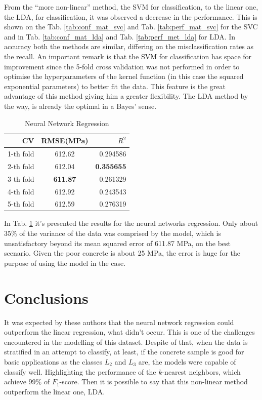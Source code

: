 \documentclass[conference]{IEEEtran}
\begin{document}
From the ``more non-linear'' method, the SVM for classification, to the linear one, the LDA, for classification, it was observed a decrease in the performance. This is shown on the Tab. \ref{tab:conf_mat_svc} and Tab. \ref{tab:perf_mat_svc} for the SVC and in Tab. \ref{tab:conf_mat_lda} and Tab. \ref{tab:perf_met_lda} for LDA. In accuracy both the methods are similar, differing on the misclassification rates as the recall. An important remark is that the SVM for classification has space for improvement since the 5-fold cross validation was not performed in order to optimise the hyperparameters of the kernel function (in this case the squared exponential parameters) to better fit the data. This feature is the great advantage of this method giving him a greater flexibility. The LDA method by the way, is already the optimal in a Bayes' sense.

\begin{table}
\centering
  \caption{Neural Network Regression}
  \label{tab:nnr}
  \begin{tabular}{rcr}
    \hline\hline
    \textbf{CV} & \textbf{RMSE}(MPa) & \textbf{$R^2$} \\\hline
    1-th fold & 612.62 & 0.294586 \\
    2-th fold & 612.04 & \textbf{0.355655} \\
    3-th fold & \textbf{611.87} & 0.261329 \\
    4-th fold & 612.92 & 0.243543 \\
    5-th fold & 612.59 & 0.276319 \\\hline\hline
  \end{tabular}
\end{table}

In Tab. \ref{tab:nnr} it's presented the results for the neural networks regression. Only about $35\%$ of the variance of the data was comprised by the model, which is unsatisfactory beyond its mean squared error of 611.87 MPa, on the best scenario. Given the poor concrete is about 25 MPa, the error is huge for the purpose of using the model in the case.

\section{Conclusions}\label{sec:conclusions}

It was expected by these authors that the neural network regression could outperform the linear regression, what didn't occur. This is one of the challenges encountered in the modelling of this dataset. Despite of that, when the data is stratified in an attempt to classify, at least, if the concrete sample is good for basic applications as the classes $L_2$ and $L_3$ are, the models were capable of classify well. Highlighting the performance of the $k$-nearest neighbors, which achieve $99\%$ of $F_1$-score. Then it is possible to say that this non-linear method outperform the linear one, LDA.
\end{document}
